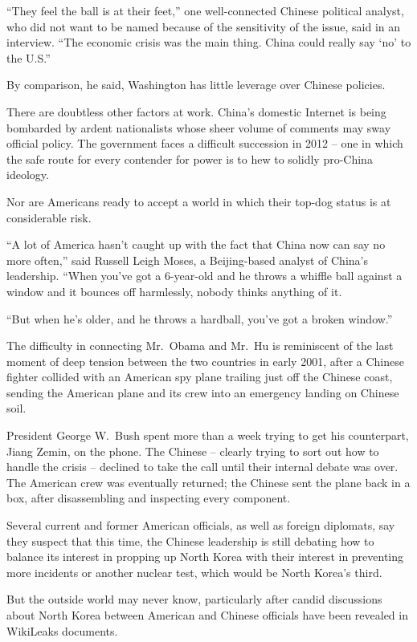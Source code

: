 ﻿\documentclass[12pt]{article}
\begin{document}
``They feel the ball is at their feet,'' one well-connected Chinese political analyst, who did not
want to be named because of the sensitivity of the issue, said in an interview. ``The economic
crisis was the main thing. China could really say `no' to the U.S.''

By comparison, he said, Washington has little leverage over Chinese policies.

There are doubtless other factors at work. China's domestic Internet is being bombarded by ardent
nationalists whose sheer volume of comments may sway official policy. The government faces a
difficult succession in 2012 -- one in which the safe route for every contender for power is to hew
to solidly pro-China ideology.

Nor are Americans ready to accept a world in which their top-dog status is at considerable risk.

``A lot of America hasn't caught up with the fact that China now can say no more often,'' said
Russell Leigh Moses, a Beijing-based analyst of China's leadership. ``When you've got a 6-year-old
and he throws a whiffle ball against a window and it bounces off harmlessly, nobody thinks anything
of it.

``But when he's older, and he throws a hardball, you've got a broken window.''

The difficulty in connecting Mr.~Obama and Mr.~Hu is reminiscent of the last moment of deep tension
between the two countries in early 2001, after a Chinese fighter collided with an American spy plane
trailing just off the Chinese coast, sending the American plane and its crew into an emergency
landing on Chinese soil.

President George W.~Bush spent more than a week trying to get his counterpart, Jiang Zemin, on the
phone. The Chinese -- clearly trying to sort out how to handle the crisis -- declined to take the
call until their internal debate was over. The American crew was eventually returned; the Chinese
sent the plane back in a box, after disassembling and inspecting every component.

Several current and former American officials, as well as foreign diplomats, say they suspect that
this time, the Chinese leadership is still debating how to balance its interest in propping up North
Korea with their interest in preventing more incidents or another nuclear test, which would be North
Korea's third.

But the outside world may never know, particularly after candid discussions about North Korea
between American and Chinese officials have been revealed in WikiLeaks documents.
\end{document}
